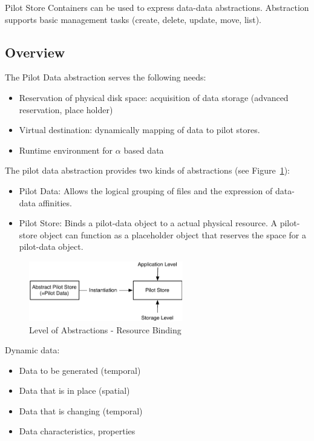 \documentclass[]{article}
\begin{document}
Pilot Store Containers can be used to express data-data abstractions. 
Abstraction supports basic management tasks (create, delete, update,
move, list). 





\subsection{Overview}

The Pilot Data abstraction serves the following needs:
\begin{itemize}
	\item Reservation of physical disk space: acquisition of data storage (advanced reservation, place holder)
	\item Virtual destination: dynamically mapping of data to pilot stores.
	\item Runtime environment for $\alpha$ based data
\end{itemize}

The pilot data abstraction provides two kinds of abstractions (see Figure~\ref{fig:figures_ps-instantiation}):
\begin{itemize}
    \item Pilot Data: Allows the logical grouping of files and the expression of data-data affinities.
    
    \item Pilot Store: Binds a pilot-data object to a actual physical resource. A pilot-store object can function as a placeholder object that reserves the space for a pilot-data object.
\end{itemize}


\begin{figure}[htbp]
    \centering
        \includegraphics[width=0.6\textwidth]{figures/ps-instantiation.pdf}
    \caption{Level of Abstractions - Resource Binding}
    \label{fig:figures_ps-instantiation}
\end{figure}



	
\noindent	
Dynamic data:
\begin{itemize}
	\item Data to be generated (temporal)
	\item Data that is in place (spatial)
	\item Data that is changing (temporal)
	\item Data characteristics, properties
\end{itemize}	
\end{document}
